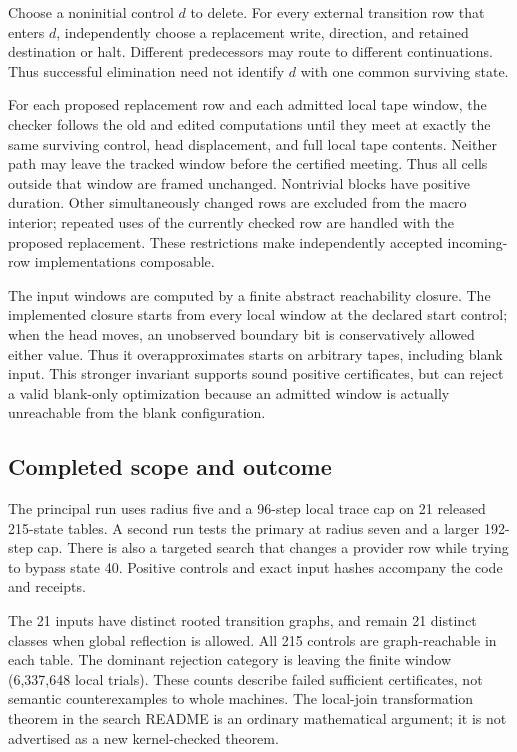 \documentclass[11pt]{article}
\theoremstyle{definition}\newtheorem{definition}[theorem]{Definition}
\begin{document}
Choose a noninitial control $d$ to delete. For every external transition row
that enters $d$, independently choose a replacement write, direction, and
retained destination or halt. Different
predecessors may route to different continuations. Thus successful elimination
need not identify $d$ with one common surviving state.

For each proposed replacement row and each admitted local tape window, the
checker follows the old and edited computations until they meet at exactly
the same surviving control, head displacement, and full local tape contents.
Neither path may leave the tracked window before the certified meeting. Thus
all cells outside that window are framed unchanged. Nontrivial blocks have
positive duration. Other simultaneously changed rows are excluded from the
macro interior; repeated uses of the currently checked row are handled with
the proposed replacement. These restrictions make independently accepted
incoming-row implementations composable.

The input windows are computed by a finite abstract reachability closure.
The implemented closure starts from every local window at the declared start
control; when the head moves, an unobserved boundary bit is conservatively
allowed either value. Thus it overapproximates starts on arbitrary tapes,
including blank input. This stronger invariant supports sound positive
certificates, but can reject a valid blank-only optimization because an
admitted window is actually unreachable from the blank configuration.

\subsection{Completed scope and outcome}

\SearchMeasurements

The principal run uses radius five and a 96-step local trace cap on 21 released
215-state tables. A second run tests the primary at radius seven and a larger
192-step cap. There is also a targeted search that changes a provider row while
trying to bypass state 40. Positive controls and exact input hashes accompany
the code and receipts.

The 21 inputs have distinct rooted transition graphs, and remain 21 distinct
classes when global reflection is allowed. All 215 controls are graph-reachable
in each table. The dominant rejection category is leaving the finite window
(6,337,648 local trials). These counts describe failed sufficient certificates,
not semantic counterexamples to whole machines. The local-join transformation
theorem in the search README is an ordinary mathematical argument; it is not
advertised as a new kernel-checked theorem.
\end{document}

